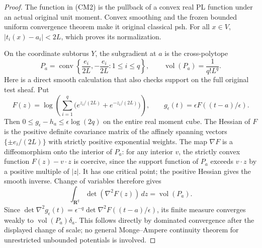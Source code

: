 \documentclass[11pt,a4paper]{article}
\numberwithin{equation}{section}
\theoremstyle{definition}
\theoremstyle{remark}
\begin{document}
\begin{proof}
The function in (CM2) is the pullback of a convex real PL function
under an actual original unit moment. Convex smoothing and the frozen
bounded uniform convergence theorem make it original classical psh.
For all $x\in V$, $|t_i(x)-a_i|<2L$, which proves its normalization.

On the coordinate subtorus $Y$, the subgradient at $a$ is the
cross-polytope
\[
                  P_a=\operatorname{conv}
                   \left\{\frac{e_i}{2L},-\frac{e_i}{2L}:1\leq i\leq q\right\},
             \qquad \operatorname{vol}(P_a)=\frac{1}{q!L^q}.
 \tag{CM5}
\]
Here is a direct smooth calculation that also checks support on
the full original test sheaf. Put
\[
 F(z)=\log\!\left(\sum_{i=1}^q
              \bigl(e^{z_i/(2L)}+e^{-z_i/(2L)}\bigr)\right),
       \qquad g_\epsilon(t)=\epsilon F((t-a)/\epsilon).
 \tag{CM5a}
\]
Then $0\leq g_\epsilon-h_a\leq\epsilon\log(2q)$ on the entire
real moment cube. The Hessian of $F$ is the positive definite
covariance matrix of the affinely spanning vectors
$\{\pm e_i/(2L)\}$ with strictly positive exponential weights.
The map $\nabla F$ is a diffeomorphism onto the interior of $P_a$:
for any interior $v$, the strictly convex function $F(z)-v\cdot z$
is coercive, since the support function of $P_a$ exceeds $v\cdot z$
by a positive multiple of $|z|$. It has one critical point;
the positive Hessian gives the smooth inverse. Change of variables
therefore gives
\[
                   \int_{\mathbf R^q}\det(\nabla^2F(z))\,dz
                          =\operatorname{vol}(P_a).
 \tag{CM5b}
\]
Since $\det\nabla^2g_\epsilon(t)
=\epsilon^{-q}\det\nabla^2F((t-a)/\epsilon)$, its finite
measure converges weakly to $\operatorname{vol}(P_a)\delta_a$.
This follows directly by dominated convergence after the displayed
change of scale; no general Monge--Ampere continuity theorem for
unrestricted unbounded potentials is involved.


\end{proof}
\end{document}

